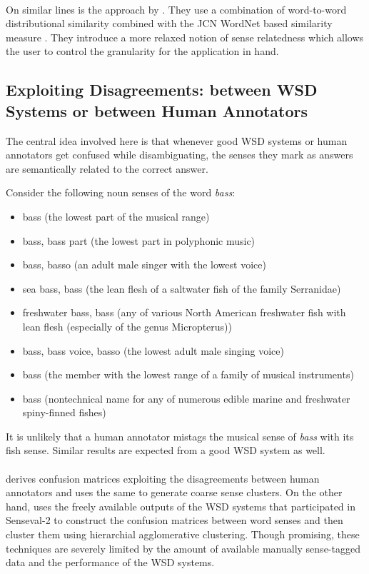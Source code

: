 \paragraph{}
On similar lines is the approach by \citep{mccarthy2006relating}. They use a combination of word-to-word distributional similarity combined with the JCN WordNet based similarity measure \citep{JCN:1997}. They introduce a more relaxed notion of sense relatedness which allows the user to control the granularity for the application in hand.

\subsection{Exploiting Disagreements: between WSD Systems or between Human Annotators}
The central idea involved here is that whenever good WSD systems or human annotators get confused while disambiguating, the senses they mark as answers are semantically related to the correct answer.
\begin{example}
Consider the following noun senses of the word \textit{bass}:
\begin{itemize}
\item bass (the lowest part of the musical range)
\item bass, bass part (the lowest part in polyphonic music)
\item bass, basso (an adult male singer with the lowest voice)
\item sea bass, bass (the lean flesh of a saltwater fish of the family Serranidae)
\item freshwater bass, bass (any of various North American freshwater fish with lean flesh (especially of the genus Micropterus))
\item bass, bass voice, basso (the lowest adult male singing voice)
\item bass (the member with the lowest range of a family of musical instruments)
\item bass (nontechnical name for any of numerous edible marine and freshwater spiny-finned fishes)
\end{itemize}
\end{example}

It is unlikely that a human annotator mistags the musical sense of \textit{bass} with its fish sense. Similar results are expected from a good WSD system as well.

\paragraph{}
\citep{chklovski2003exploiting} derives confusion matrices exploiting the disagreements between human annotators and uses the same to generate coarse sense clusters. On the other hand, \citep{agirre2003clustering} uses the freely available outputs of the WSD systems that participated in Senseval-2 \citep{Edmonds:2001} to construct the confusion matrices between word senses and then cluster them using hierarchial agglomerative clustering. Though promising, these techniques are severely limited by the amount of available manually sense-tagged data and the performance of the WSD systems.

